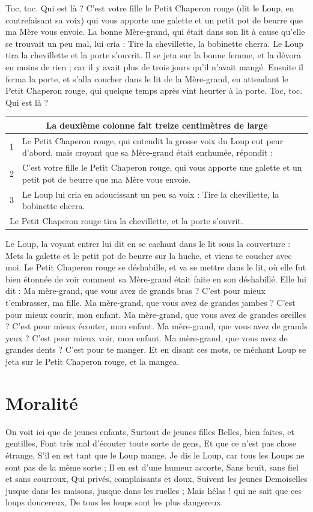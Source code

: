 \documentclass[a4paper,11pt]{article}
\begin{document}
Toc, toc. Qui est là ? C'est votre fille le Petit Chaperon rouge (dit le Loup, en contrefaisant sa voix) qui vous apporte une galette et un petit pot de beurre que ma Mère vous envoie. La bonne Mère-grand, qui était dans son lit à cause qu'elle se trouvait un peu mal, lui cria : Tire la chevillette, la bobinette cherra.
Le Loup tira la chevillette et la porte s'ouvrit. Il se jeta sur la bonne femme, et la dévora en moins de rien ; car il y avait plus de trois jours qu'il n'avait mangé. Ensuite il ferma la porte, et s'alla coucher dans le lit de la Mère-grand, en attendant le Petit Chaperon rouge, qui quelque temps après vint heurter à la porte. Toc, toc. Qui est là ?

\begin{center}
\begin{tabular}{|c|p{13cm}|}\hline
\multicolumn{2}{|c|}{La deuxième colonne fait treize centimètres de large}\\\hline
1 & Le Petit Chaperon rouge, qui entendit la grosse voix du Loup eut peur d'abord, mais croyant que sa Mère-grand était enrhumée, répondit :\\
2 & C'est votre fille le Petit Chaperon rouge, qui vous apporte une galette et un petit pot de beurre que ma Mère vous envoie.\\\hline
3 & Le Loup lui cria en adoucissant un peu sa voix : Tire la chevillette, la bobinette cherra.\\\hline
\multicolumn{2}{|l|}{Le Petit Chaperon rouge tira la chevillette, et la porte s'ouvrit.}\\\hline
\end{tabular}
\end{center}

Le Loup, la voyant entrer lui dit en se cachant dans le lit sous la couverture : Mets la galette et le petit pot de beurre sur la huche, et viens te coucher avec moi. Le Petit Chaperon rouge se déshabille, et va se mettre dans le lit, où elle fut bien étonnée de voir comment sa Mère-grand était faite en son déshabillé. Elle lui dit : Ma mère-grand, que vous avez de grands bras ? C'est pour mieux t'embrasser, ma fille. Ma mère-grand, que vous avez de grandes jambes ? C'est pour mieux courir, mon enfant. Ma mère-grand, que vous avez de grandes oreilles ?
C'est pour mieux écouter, mon enfant. Ma mère-grand, que vous avez de grands yeux ? C'est pour mieux voir, mon enfant. Ma mère-grand, que vous avez de grandes dents ? C'est pour te manger. Et en disant ces mots, ce méchant Loup se jeta sur le Petit Chaperon rouge, et la mangea.

\section{Moralité}
On voit ici que de jeunes enfants, Surtout de jeunes filles Belles, bien faites, et gentilles, Font très mal d'écouter toute sorte de gens, Et que ce n'est pas chose étrange, S'il en est tant que le Loup mange.
Je dis le Loup, car tous les Loups ne sont pas de la même sorte ; Il en est d'une humeur accorte, Sans bruit, sans fiel et sans courroux, Qui privés, complaisants et doux, Suivent les jeunes Demoiselles jusque dans les maisons, jusque dans les ruelles ; Mais hélas ! qui ne sait que ces loups doucereux, De tous les loups sont les plus dangereux.
\end{document}
